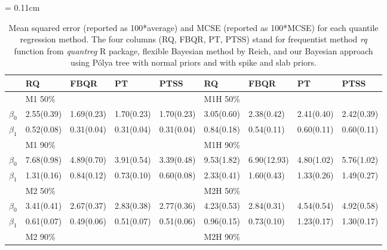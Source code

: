 \documentclass[12pt]{article}
\newcommand{\polya}{P\'{o}lya}
\begin{document}
\begin{center}
  \begin{table}[h]
    \centering
    \caption[]{ Mean squared error (reported as 100*average) and MCSE
      (reported as 100*MCSE) for each
      quantile regression method.   The four
      columns (RQ, FBQR,
      PT, PTSS) stand for frequentist method \textit{rq} function from
      \textit{quantreg} R package, flexible Bayesian method by Reich, and
      our Bayesian approach using \polya{} tree with normal priors and with
      spike and slab priors.}
    \vspace{4mm}
    \tabcolsep = 0.11cm
    \begin{tabular}[tb]{c|llll|llll}
      \hline
                & RQ            & FBQR        & PT          & PTSS        & RQ           & FBQR        & PT          & PTSS        \\
      \hline
                & M1 50\%       &             &             &             & M1H 50\%     &             &             &             \\
      $\beta_0$ & 2.55(0.39)    & 1.69(0.23)  & 1.70(0.23)  & 1.70(0.23)  & 3.05(0.60)   & 2.38(0.42)  & 2.41(0.40)  & 2.42(0.39)  \\
      $\beta_1$ & 0.52(0.08)    & 0.31(0.04)  & 0.31(0.04)  & 0.31(0.04)  & 0.84(0.18)   & 0.54(0.11)  & 0.60(0.11)  & 0.60(0.11)  \\
                & M1 90\%       &             &             &             & M1H 90\%     &             &             &             \\
      $\beta_0$ & 7.68(0.98)    & 4.89(0.70)  & 3.91(0.54)  & 3.39(0.48)  & 9.53(1.82)   & 6.90(12.93) & 4.80(1.02)  & 5.76(1.02)  \\
      $\beta_1$ & 1.31(0.16)    & 0.84(0.12)  & 0.73(0.10)  & 0.60(0.08)  & 2.33(0.41)   & 1.60(0.43)  & 1.33(0.26)  & 1.49(0.27)  \\
      \hline
                & M2 50\%       &             &             &             & M2H 50\%     &             &             &             \\
      $\beta_0$ & 3.41(0.41)    & 2.67(0.37)  & 2.83(0.38)  & 2.77(0.36)  & 4.23(0.53)   & 2.84(0.31)  & 4.54(0.54)  & 4.92(0.58)  \\
      $\beta_1$ & 0.61(0.07)    & 0.49(0.06)  & 0.51(0.07)  & 0.51(0.06)  & 0.96(0.15)   & 0.73(0.10)  & 1.23(0.17)  & 1.30(0.17)  \\
                & M2 90\%       &             &             &             & M2H 90\%     &             &             &             \\

\end{tabular}
\end{table}
\end{center}
\end{document}
